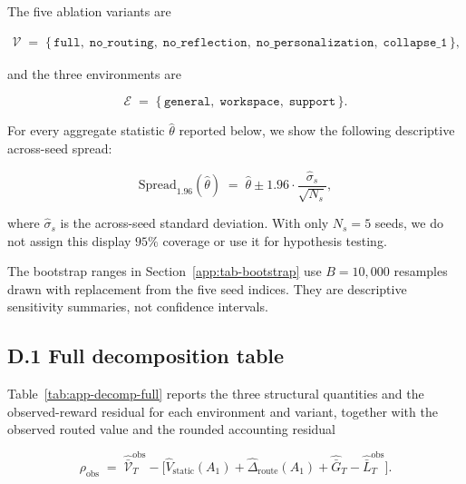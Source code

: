 \documentclass{article} %
\begin{document}
The five ablation variants are

\begin{align}
\label{eq:app-tab-variants}
\mathcal{V} \;=\; \{\,\texttt{full},\; \texttt{no\_routing},\; \texttt{no\_reflection},\; \texttt{no\_personalization},\; \texttt{collapse\_1}\,\},
\end{align}

and the three environments are

\begin{equation}
\label{eq:app-tab-envs}
\mathcal{E} \;=\; \{\,\texttt{general},\; \texttt{workspace},\; \texttt{support}\,\}.
\end{equation}

For every aggregate statistic \(\widehat\theta\) reported below, we show the
following descriptive across-seed spread:

\begin{equation}
\label{eq:app-tab-spread}
\mathrm{Spread}_{1.96}(\widehat\theta)
\;=\;
\widehat\theta \pm 1.96\cdot \frac{\widehat\sigma_s}{\sqrt{N_s}},
\end{equation}

where \(\widehat\sigma_s\) is the across-seed standard deviation. With only
\(N_s=5\) seeds, we do not assign this display \(95\%\) coverage or use it for
hypothesis testing.

The bootstrap ranges in Section~\ref{app:tab-bootstrap} use \(B=10{,}000\)
resamples drawn with replacement from the five seed indices. They are
descriptive sensitivity summaries, not confidence intervals.

\subsection{D.1 Full decomposition table}

\label{app:tab-decomp}

Table~\ref{tab:app-decomp-full} reports the three structural quantities and the
observed-reward residual for each environment and variant, together with the
observed routed value and the rounded accounting residual

\begin{equation}
\label{eq:app-tab-residual}
\rho_{\mathrm{obs}}
\;=\;
\widehat{\bar{\mathcal V}}_T^{\mathrm{obs}}
- \big[\widehat V_{\mathrm{static}}(A_1)
+ \widehat\Delta_{\mathrm{route}}(A_1)
+ \widehat{\bar G}_T
- \widehat{\bar L}_T^{\mathrm{obs}}\big].
\end{equation}
\end{document}
